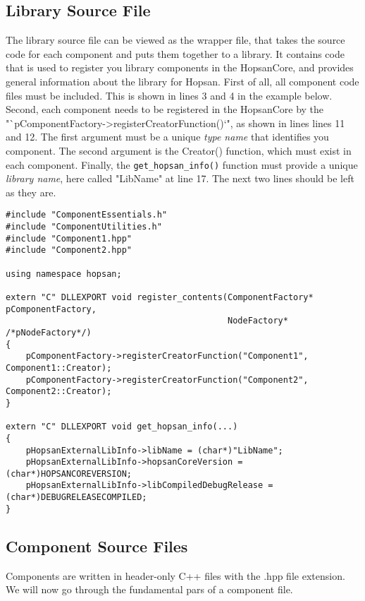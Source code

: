 \documentclass[a4paper,pdftex]{article}
\begin{document}
\subsection*{Library Source File}
The library source file can be viewed as the wrapper file, that takes the source code for each component and puts them together to a library. 
It contains code that is used to register you library components in the HopsanCore, and provides general information about the library for Hopsan.
First of all, all component code files must be included. This is shown in lines 3 and 4 in the example below.
Second, each component needs to be registered in the HopsanCore by the "`pComponentFactory->registerCreatorFunction()`", as shown in lines  lines 11 and 12.
The first argument must be a unique \textit{type name} that identifies you component. 
The second argument is the Creator() function, which must exist in each component.
Finally, the \texttt{get\_hopsan\_info()} function must provide a unique \textit{library name}, here called "LibName" at line 17. 
The next two lines should be left as they are.


\begin{minipage}{\linewidth}
\begin{lstlisting}[basicstyle=\footnotesize\ttfamily]
#include "ComponentEssentials.h"
#include "ComponentUtilities.h"
#include "Component1.hpp"
#include "Component2.hpp"

using namespace hopsan;

extern "C" DLLEXPORT void register_contents(ComponentFactory* pComponentFactory, 
                                            NodeFactory* /*pNodeFactory*/)
{    
    pComponentFactory->registerCreatorFunction("Component1", Component1::Creator);
    pComponentFactory->registerCreatorFunction("Component2", Component2::Creator);
}

extern "C" DLLEXPORT void get_hopsan_info(...)
{
    pHopsanExternalLibInfo->libName = (char*)"LibName";
    pHopsanExternalLibInfo->hopsanCoreVersion = (char*)HOPSANCOREVERSION;
    pHopsanExternalLibInfo->libCompiledDebugRelease = (char*)DEBUGRELEASECOMPILED;
}
\end{lstlisting}
\end{minipage}

\subsection*{Component Source Files}
Components are written in header-only C++ files with the .hpp file extension. 
We will now go through the fundamental pars of a component file.\\
\end{document}
